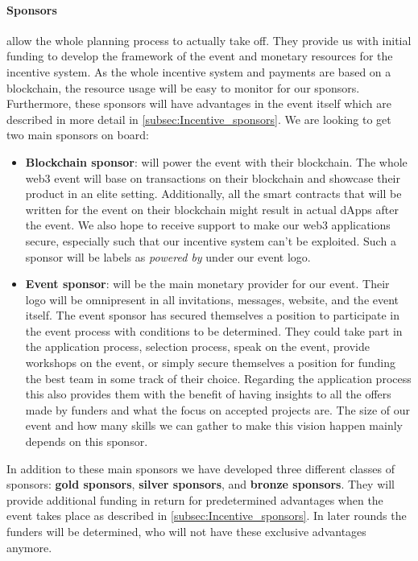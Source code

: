 \paragraph{Sponsors} allow the whole planning process to actually take off. They provide us with initial funding to develop the framework of the event and monetary resources for the incentive system. As the whole incentive system and payments are based on a blockchain, the resource usage will be easy to monitor for our sponsors. Furthermore, these sponsors will have advantages in the event itself which are described in more detail in \autoref{subsec:Incentive_sponsors}. We are looking to get two main sponsors on board:
\begin{itemize}
    \item \textbf{Blockchain sponsor}: will power the event with their blockchain. The whole web3 event will base on transactions on their blockchain and showcase their product in an elite setting. Additionally, all the smart contracts that will be written for the event on their blockchain might result in actual dApps after the event. We also hope to receive support to make our web3 applications secure, especially such that our incentive system can't be exploited. Such a sponsor will be labels as \textit{powered by} under our event logo.
    \item \textbf{Event sponsor}: will be the main monetary provider for our event. Their logo will be omnipresent in all invitations, messages, website, and the event itself. The event sponsor has secured themselves a position to participate in the event process with conditions to be determined. They could take part in the application process, selection process, speak on the event, provide workshops on the event, or simply secure themselves a position for funding the best team in some track of their choice. Regarding the application process this also provides them with the benefit of having insights to all the offers made by funders and what the focus on accepted projects are. The size of our event and how many skills we can gather to make this vision happen mainly depends on this sponsor.
\end{itemize}
In addition to these main sponsors we have developed three different classes of sponsors: \textbf{gold sponsors}, \textbf{silver sponsors}, and \textbf{bronze sponsors}. They will provide additional funding in return for predetermined advantages when the event takes place as described in \autoref{subsec:Incentive_sponsors}. In later rounds the funders will be determined, who will not have these exclusive advantages anymore.

